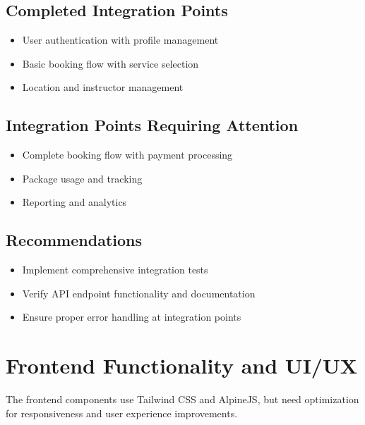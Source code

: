 \subsection{Completed Integration Points}
\begin{itemize}
    \item User authentication with profile management
    \item Basic booking flow with service selection
    \item Location and instructor management
\end{itemize}

\subsection{Integration Points Requiring Attention}
\begin{itemize}
    \item Complete booking flow with payment processing
    \item Package usage and tracking
    \item Reporting and analytics
\end{itemize}

\subsection{Recommendations}
\begin{itemize}
    \item Implement comprehensive integration tests
    \item Verify API endpoint functionality and documentation
    \item Ensure proper error handling at integration points
\end{itemize}

\clearpage
\section{Frontend Functionality and UI/UX}

\begin{tcolorbox}[
    enhanced,
    title={~75\% Complete},
    attach boxed title to top left,
    boxed title style={
        colback=primary!50,
        colframe=primary!50,
        arc=0mm,
    },
    colback=white,
    colframe=primary!50,
    arc=0mm,
    fonttitle=\bfseries
]
    The frontend components use Tailwind CSS and AlpineJS, but need optimization for responsiveness and user experience improvements.
\end{tcolorbox}

